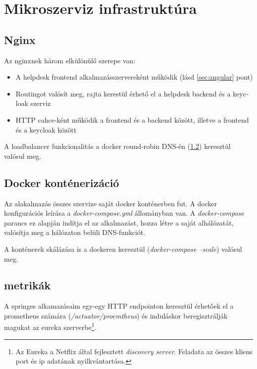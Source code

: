 \section{Mikroszerviz infrastruktúra}

\subsection{Nginx}
Az nginxnek három elkülönülő szerepe van:

\begin{itemize}
	\item{A \foreignlanguage{british}{helpdesk frontend} alkalmazásszervereként működik (lásd \ref{sec:angular} pont)}
	
	\item{\foreignlanguage{british}{Routing}ot valósít meg, rajta kerestül érhető el a \foreignlanguage{british}{helpdesk backend} és a \foreignlanguage{british}{keycloak} szerviz}
	
	\item{\foreignlanguage{british}{HTTP cahce}-ként működik a frontend és a backend között, illetve a frontend és a keycloak között}
\end{itemize}

A loadbalancer funkcionalitás a \foreignlanguage{british}{docker round-robin DNS}-én (\ref{sec:docker}) keresztül valósul meg.


\subsection{Docker konténerizáció}\label{sec:docker}
Az alakalmazás összes szervize saját docker konténerben fut. A docker konfigurációs leírása a \textit{docker-compose.yml} állományban van. A \textit{docker-compose} parancs ez alapján indítja el az alkalmazást, hozza létre a saját alhálózatát, valósítja meg a hálózaton belüli DNS-funkciót.

A konténerek skálázása  is a dockeren keresztül (\textit{docker-compose --scale}) valósul meg.



\subsection{metrikák}
A springes alkamazásaim egy-egy HTTP endpointon keresztül érhetőek el a prometheus számára (\textit{\mbox{/actuator/proemtheus}}) és induláskor beregisztrálják magukat az eureka szerverbe\footnote{Az Eureka a Netflix által fejlesztett \textit{discovery server}. Feladata az összes kliens port és ip adatának nyilkvántartása.}.

